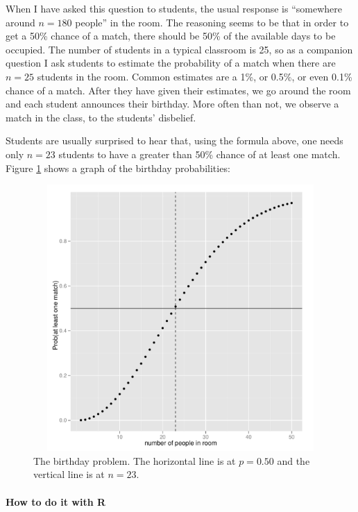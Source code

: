 \documentclass[captions=tableheading]{scrbook}
\begin{document}
\begin{example}
When I have asked this question to students, the usual response is ``somewhere around \(n=180\) people'' in the room. The reasoning seems to be that in order to get a 50\% chance of a match, there should be 50\% of the available days to be occupied. The number of students in a typical classroom is 25, so as a companion question I ask students to estimate the probability of a match when there are \(n=25\) students in the room. Common estimates are a 1\%, or 0.5\%, or even 0.1\% chance of a match. After they have given their estimates, we go around the room and each student announces their birthday. More often than not, we observe a match in the class, to the students' disbelief.

Students are usually surprised to hear that, using the formula above, one needs only \(n=23\) students to have a greater than 50\% chance of at least one match. Figure \ref{fig:birthday} shows a graph of the birthday probabilities:
\end{example}





\begin{figure}[th]
    \includegraphics[width=5in, height=4in]{img/birthday.pdf}
    \caption[The birthday problem]{The birthday problem. {\small The horizontal line is at \(p=0.50\) and the vertical line is at \(n=23\).}}
    \label{fig:birthday}
  \end{figure}


\paragraph*{How to do it with \textsf{R}}
\end{document}
